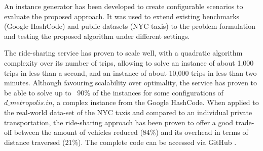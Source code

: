 An instance generator has been developed to create configurable scenarios to evaluate the proposed approach. It was used to extend existing benchmarks (Google HashCode) and public datasets (NYC taxis) to the problem formulation and testing the proposed algorithm under different settings. 

The ride-sharing service has proven to scale well,  with a quadratic algorithm complexity over its number of trips, allowing to solve an instance of about 1,000 trips in less than a second, and an instance of about 10,000 trips in less than two minutes.  Although favouring scalability over optimality, the service has proven to be able to solve up to ~90\% of the instances for some configurations of $d\_metropolis.in$, a complex instance from the Google HashCode.  
When applied to the real-world data-set of the NYC taxis and compared to an individual private transportation, the ride-sharing approach has been proven to offer a good trade-off between the amount of vehicles reduced (84\%) and its overhead in terms of distance traversed (21\%). The complete code can be accessed via GitHub \cite{smartgreenscode}. 